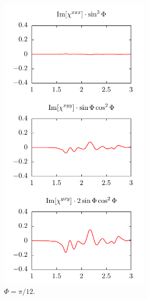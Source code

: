 \documentclass[aps,prb,10pt,letterpaper,notitlepage]{revtex4-1}
\begin{document}
\begin{figure}[b]
    \centering
    \begin{subfigure}[b]{0.25\textwidth}
        \includegraphics[width=0.8\textwidth]{rot/comps15.pdf}
        \caption{$\Phi = \pi/12$.}
    \end{subfigure}
    ~ 
    \begin{subfigure}[b]{0.25\textwidth}

\end{subfigure}
\end{figure}
\end{document}
